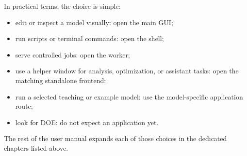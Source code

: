 In practical terms, the choice is simple:
\begin{itemize}
\item edit or inspect a model visually: open the main GUI;
\item run scripts or terminal commands: open the shell;
\item serve controlled jobs: open the worker;
\item use a helper window for analysis, optimization, or assistant tasks: open the matching standalone frontend;
\item run a selected teaching or example model: use the model-specific application route;
\item look for DOE: do not expect an application yet.
\end{itemize}

The rest of the user manual expands each of those choices in the dedicated
chapters listed above.

